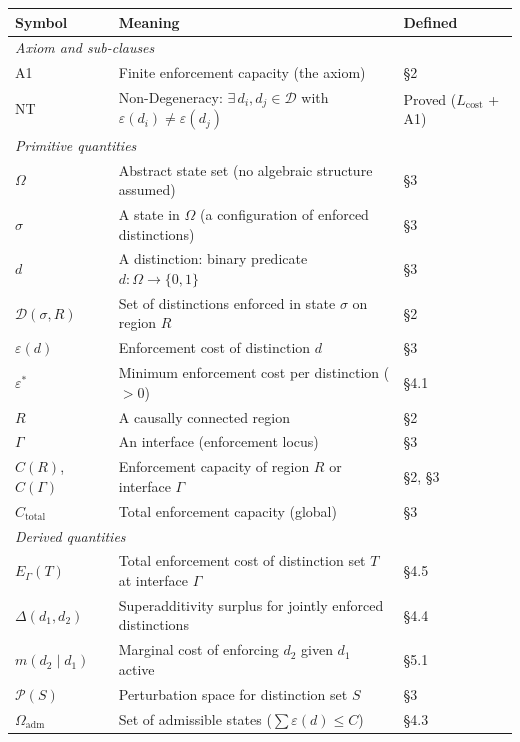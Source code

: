\documentclass[11pt]{article}
\theoremstyle{remark}
\begin{document}
\begin{center}
\small
{}
\smallskip
\begin{tabular}{lp{8.5cm}l}
\toprule
\textbf{Symbol} & \textbf{Meaning} & \textbf{Defined} \\
\midrule
\multicolumn{3}{l}{\textit{Axiom and sub-clauses}} \\[2pt]
A1 & Finite enforcement capacity (the axiom) & \S2 \\
NT & Non-Degeneracy: $\exists\,d_i,d_j\in\mathcal{D}$ with $\varepsilon(d_i)\ne\varepsilon(d_j)$ & Proved ($L_{\mathrm{cost}}$ + A1) \\[4pt]
\multicolumn{3}{l}{\textit{Primitive quantities}} \\[2pt]
$\Omega$ & Abstract state set (no algebraic structure assumed) & \S3 \\
$\sigma$ & A state in $\Omega$ (a configuration of enforced distinctions) & \S3 \\
$d$ & A distinction: binary predicate $d: \Omega \to \{0,1\}$ & \S3 \\
$\mathcal{D}(\sigma,R)$ & Set of distinctions enforced in state $\sigma$ on region $R$ & \S2 \\
$\varepsilon(d)$ & Enforcement cost of distinction $d$ & \S3 \\
$\varepsilon^*$ & Minimum enforcement cost per distinction ($>0$) & \S4.1 \\
$R$ & A causally connected region & \S2 \\
$\Gamma$ & An interface (enforcement locus) & \S3 \\
$C(R)$, $C(\Gamma)$ & Enforcement capacity of region $R$ or interface $\Gamma$ & \S2, \S3 \\
$C_{\mathrm{total}}$ & Total enforcement capacity (global) & \S3 \\[4pt]
\multicolumn{3}{l}{\textit{Derived quantities}} \\[2pt]
$E_\Gamma(T)$ & Total enforcement cost of distinction set $T$ at interface $\Gamma$ & \S4.5 \\
$\Delta(d_1,d_2)$ & Superadditivity surplus for jointly enforced distinctions & \S4.4 \\
$m(d_2 \mid d_1)$ & Marginal cost of enforcing $d_2$ given $d_1$ active & \S5.1 \\
$\mathcal{P}(S)$ & Perturbation space for distinction set $S$ & \S3 \\
$\Omega_{\mathrm{adm}}$ & Set of admissible states ($\sum \varepsilon(d) \le C$) & \S4.3 \\[4pt]

\end{tabular}
\end{center}
\end{document}
